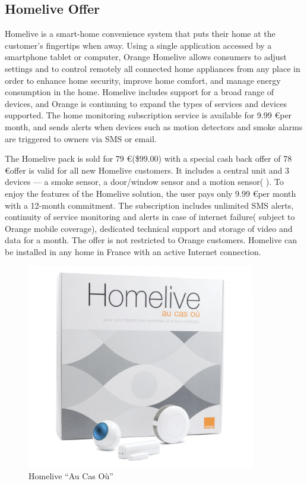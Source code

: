 \subsection{Homelive Offer}

Homelive is a smart-home convenience system that puts their home at the customer’s fingertips when away. Using a single application accessed by a smartphone tablet or computer, Orange Homelive allows consumers to adjust settings and to control remotely all connected home appliances from any place in order to enhance home security, improve home comfort, and manage energy consumption in the home. Homelive includes support for a broad range of devices, and Orange is continuing to expand the types of services and devices supported. The home monitoring subscription service is available for 9.99 \euro per month, and sends alerts when devices such as motion detectors and smoke alarms are triggered to owners via SMS or email.

The Homelive pack is sold for 79 \euro (\$99.00) with a special cash back offer of 78 \euro offer is valid for all new Homelive customers. It includes a central unit and 3 devices — a smoke sensor, a door/window sensor and a motion sensor( ). To enjoy the features of the Homelive solution, the user pays only 9.99 \euro per month with a 12-month commitment. The subscription includes unlimited SMS alerts, continuity of service monitoring and alerts in case of internet failure( subject to Orange mobile coverage), dedicated technical support and storage of video and data for a month. The offer is not restricted to Orange customers. Homelive can be installed in any home in France with an active Internet connection.%

\begin{figure}[htbp]
	\centering
		\includegraphics[width=10cm]{Figures/Pack_Accesoires_Homelive.jpg}
	\caption[Homelive ``Au Cas Où'']{Homelive ``Au Cas Où''}%
	\label{fig:1}
\end{figure}

